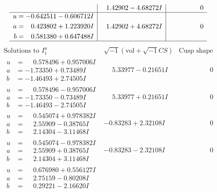 \documentclass[1p]{elsarticle_modified}
\theoremstyle{definition}
\newcommand{\I}{\sqrt{-1}}
\begin{document}
$$\begin{array}{c|c|c}
 & \phantom{-}1.42902 - 4.68272 I & \phantom{-0.000000 } 0 \\ \hline\begin{aligned}
u &= -0.642511 - 0.606712 I \\
a &= \phantom{-}0.423802 + 1.223920 I \\
b &= \phantom{-}0.581380 + 0.647488 I\end{aligned}
 & \phantom{-}1.42902 + 4.68272 I & \phantom{-0.000000 } 0\\
 \hline 
 \end{array}$$\newpage$$\begin{array}{c|c|c}  
\text{Solutions to }I^u_{1}& \I (\text{vol} + \sqrt{-1}CS) & \text{Cusp shape}\\
 \hline 
\begin{aligned}
u &= \phantom{-}0.578496 + 0.957006 I \\
a &= -1.73350 + 0.73489 I \\
b &= -1.46493 + 2.74505 I\end{aligned}
 & \phantom{-}5.33977 - 0.21651 I & \phantom{-0.000000 } 0 \\ \hline\begin{aligned}
u &= \phantom{-}0.578496 - 0.957006 I \\
a &= -1.73350 - 0.73489 I \\
b &= -1.46493 - 2.74505 I\end{aligned}
 & \phantom{-}5.33977 + 0.21651 I & \phantom{-0.000000 } 0 \\ \hline\begin{aligned}
u &= \phantom{-}0.545074 + 0.978382 I \\
a &= \phantom{-}2.55909 - 0.38765 I \\
b &= \phantom{-}2.14304 - 3.11468 I\end{aligned}
 & -0.83283 + 2.32108 I & \phantom{-0.000000 } 0 \\ \hline\begin{aligned}
u &= \phantom{-}0.545074 - 0.978382 I \\
a &= \phantom{-}2.55909 + 0.38765 I \\
b &= \phantom{-}2.14304 + 3.11468 I\end{aligned}
 & -0.83283 - 2.32108 I & \phantom{-0.000000 } 0 \\ \hline\begin{aligned}
u &= \phantom{-}0.676980 + 0.556127 I \\
a &= \phantom{-}2.75159 - 0.80208 I \\
b &= \phantom{-}0.29221 - 2.16620 I\end{aligned}

\end{array}$$
\end{document}
